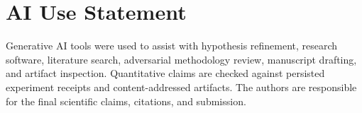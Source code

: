 \section*{AI Use Statement}
Generative AI tools were used to assist with hypothesis refinement, research software, literature search, adversarial methodology review, manuscript drafting, and artifact inspection. Quantitative claims are checked against persisted experiment receipts and content-addressed artifacts. The authors are responsible for the final scientific claims, citations, and submission.
